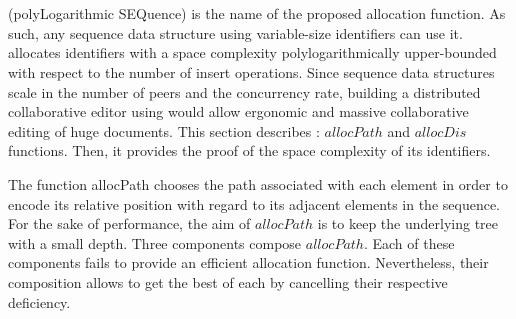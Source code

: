 
\section{\NAME{}}
\label{sec:proposal}

\NAME{} (polyLogarithmic SEQuence) is the name of the proposed allocation
function. As such, any sequence data structure using variable-size identifiers
can use it. \NAME{} allocates identifiers with a space complexity
polylogarithmically upper-bounded with respect to the number of insert
operations. Since sequence data structures scale in the number of peers and the
concurrency rate, building a distributed collaborative editor using \NAME{}
would allow ergonomic and massive collaborative editing of huge documents. This
section describes \NAME{}: $allocPath$ and $allocDis$ functions. Then, it
provides the proof of the space complexity of its identifiers.

\begin{asparadesc}
\item [The function allocPath] chooses the path associated with each element in
  order to encode its relative position with regard to its adjacent elements in
  the sequence. For the sake of performance, the aim of $allocPath$ is to keep
  the underlying tree with a small depth. Three components compose
  $allocPath$. Each of these components fails to provide an efficient
  allocation function. Nevertheless, their composition allows to get the best
  of each by cancelling their respective deficiency.
\end{asparadesc}

